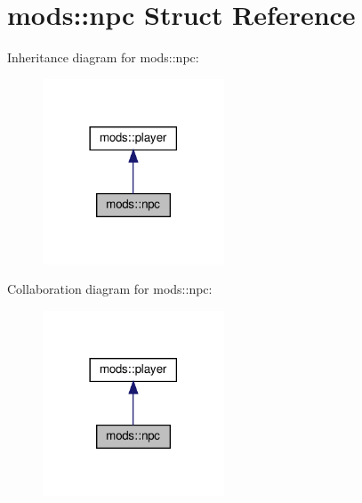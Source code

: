 \hypertarget{structmods_1_1npc}{}\section{mods\+:\+:npc Struct Reference}
\label{structmods_1_1npc}


Inheritance diagram for mods\+:\+:npc\+:\nopagebreak
\begin{figure}[H]
\begin{center}
\leavevmode
\includegraphics[width=153pt]{structmods_1_1npc__inherit__graph}
\end{center}
\end{figure}


Collaboration diagram for mods\+:\+:npc\+:\nopagebreak
\begin{figure}[H]
\begin{center}
\leavevmode
\includegraphics[width=153pt]{structmods_1_1npc__coll__graph}
\end{center}
\end{figure}
